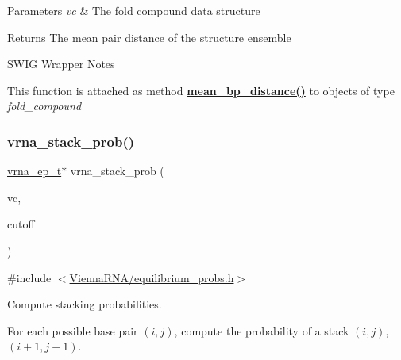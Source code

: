 \begin{DoxyParams}{Parameters}
{\em vc} & The fold compound data structure \\
\hline
\end{DoxyParams}
\begin{DoxyReturn}{Returns}
The mean pair distance of the structure ensemble
\end{DoxyReturn}
\begin{DoxyRefDesc}{S\+W\+I\+G Wrapper Notes}
\item[\hyperlink{wrappers__wrappers000085}{S\+W\+I\+G Wrapper Notes}]This function is attached as method {\bfseries \hyperlink{group__pf__fold_ga79cbc375af65f11609feb6b055269e7d}{mean\+\_\+bp\+\_\+distance()}} to objects of type {\itshape fold\+\_\+compound} \end{DoxyRefDesc}
\mbox{\label{group__pf__fold_ga132664bf29fdc30bb5ea715491d1ab22}} 
\subsubsection{\texorpdfstring{vrna\+\_\+stack\+\_\+prob()}{vrna\_stack\_prob()}}
{\footnotesize\ttfamily \hyperlink{group__struct__utils_gab9ac98ab55ded9fb90043b024b915aca}{vrna\+\_\+ep\+\_\+t}$\ast$ vrna\+\_\+stack\+\_\+prob (\begin{DoxyParamCaption}\item[{\hyperlink{group__fold__compound_ga1b0cef17fd40466cef5968eaeeff6166}{vrna\+\_\+fold\+\_\+compound\+\_\+t} $\ast$}]{vc,  }\item[{double}]{cutoff }\end{DoxyParamCaption})}



{\ttfamily \#include $<$\hyperlink{equilibrium__probs_8h}{Vienna\+R\+N\+A/equilibrium\+\_\+probs.\+h}$>$}



Compute stacking probabilities. 

For each possible base pair $(i,j)$, compute the probability of a stack $(i,j)$, $(i+1, j-1)$.


